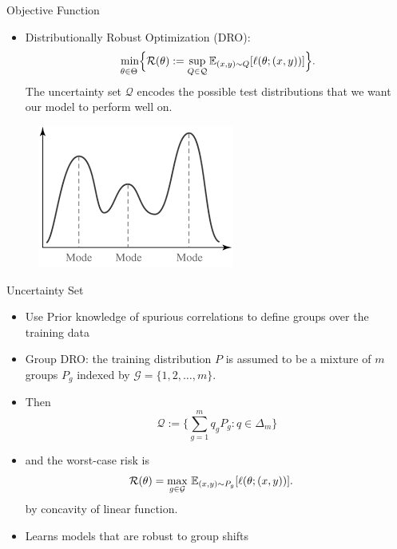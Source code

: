 \documentclass{beamer}
\begin{document}
\begin{viterbiframe}{{Objective Function}}
\begin{itemize}
    \item Distributionally Robust Optimization (DRO):
        \begin{align}\label{eq:dro}
          \underset{\theta \in \Theta}{\vphantom{\sup}\min} \Bigl\{ \mathcal{R}(\theta) := \sup_{Q \in \mathcal{Q}} \mathbb{E}_{(x, y) \sim Q}[\ell(\theta; (x, y))] \Bigr\}.
        \end{align}
        \pause
    The uncertainty set $\mathcal{Q}$ encodes the \alert{possible test distributions} that we want our model to perform well on.
    \end{itemize}
    \begin{figure}
        \centering
        \includegraphics[width=.4\linewidth]{img/mmodal.png}
    \end{figure}
\end{viterbiframe}

\begin{viterbiframe}{Uncertainty Set}

\begin{itemize}
 \item Use \alert{Prior knowledge} of spurious correlations to \alert{define groups} over the training data
 
 \pause
 \item \alert{Group DRO}: the training distribution $P$ is assumed to be a mixture of $m$ groups $P_g$ indexed by $\mathcal{G} = \{1, 2, \ldots, m\}$.
 \pause
 \item Then 
 \[
 \mathcal{Q} := \{ \sum_{g=1}^m q_g P_g: q \in \Delta_m \}
 \]
 \pause
 \item and the worst-case risk is
 \begin{align}
\label{eqn:groupdroq}
  \mathcal{R}(\theta)
  &= \underset{g \in \mathcal{G}}{\max} \ \mathbb{E}_{(x, y) \sim P_g}[\ell(\theta; (x, y))].
\end{align} 
    by concavity of linear function.

\pause
 \item Learns models that are robust to \alert{group shifts}

\end{itemize}
 
\end{viterbiframe}  
\end{document}
